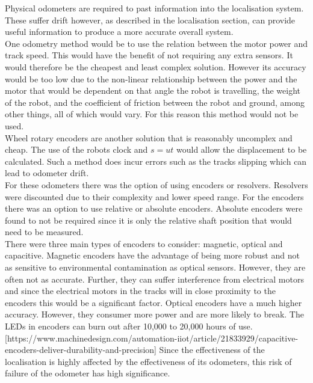 \documentclass[11pt]{article}		%
\begin{document}
        Physical odometers are required to past information into the localisation system. 
        These suffer drift however, as described in the localisation section, can provide useful information to produce a more accurate overall system.
        \\
        One odometry method would be to use the relation between the motor power and track speed.
        This would have the benefit of not requiring any extra sensors. 
        It would therefore be the cheapest and least complex solution.
        However its accuracy would be too low due to the non-linear relationship between the power and the motor that would be dependent on that angle the robot is travelling, the weight of the robot, and the coefficient of friction between the robot and ground, among other things, all of which would vary.
        For this reason this method would not be used.
        \\
        Wheel rotary encoders are another solution that is reasonably uncomplex and cheap.
        The use of the robots clock and $s=ut$ would allow the displacement to be calculated. 
        Such a method does incur errors such as the tracks slipping which can lead to odometer drift.
        \\
        For these odometers there was the option of using encoders or resolvers.
        Resolvers were discounted due to their complexity and lower speed range.
        For the encoders there was an option to use relative or absolute encoders. 
        Absolute encoders were found to not be required since it is only the relative shaft position that would need to be measured.
        \\
        There were three main types of encoders to consider: magnetic, optical and capacitive.
        Magnetic encoders have the advantage of being more robust and not as sensitive to environmental contamination as optical sensors.
        However, they are often not as accurate. 
        Further, they can suffer interference from electrical motors and since the electrical motors in the tracks will in close proximity to the encoders this would be a significant factor. 
        Optical encoders have a much higher accuracy. 
        However, they consumer more power and are more likely to break. 
        The LEDs in encoders can burn out after 10,000 to 20,000 hours of use. [https://www.machinedesign.com/automation-iiot/article/21833929/capacitive-encoders-deliver-durability-and-precision]
        Since the effectiveness of the localisation is highly affected by  the effectiveness of its odometers, this risk of failure of the odometer has high significance.
\end{document}

